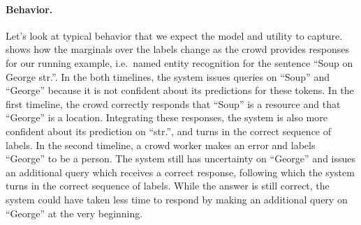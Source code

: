 
\paragraph{Behavior.}
Let's look at typical behavior that we expect the model and utility to capture.
 shows how the marginals over the labels change as the crowd provides responses for our running example, i.e.\ named entity recognition for the sentence ``Soup on George str.''.
In the both timelines, the system issues queries on ``Soup'' and ``George'' because it is not confident about its predictions for these tokens.
In the first timeline, the crowd correctly responds that ``Soup'' is a resource and that ``George'' is a location.
Integrating these responses, the system is also more confident about its prediction on ``str.'', and turns in the correct sequence of labels.
In the second timeline, a crowd worker makes an error and labels ``George'' to be a person.
The system still has uncertainty on ``George'' and issues an additional query which receives a correct response, following which the system turns in the correct sequence of labels.
While the answer is still correct, the system could have taken less time to respond by making an additional query on ``George'' at the very beginning.





